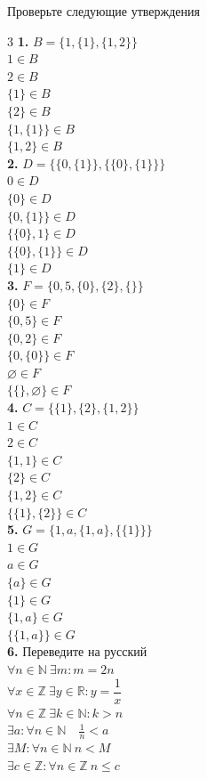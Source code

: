 \begin{exercise}
Проверьте следующие утверждения
\begin{multicols}{3}
\noindent \textbf{1.}
$B = \{1,\{1\},\{1,2\}\}$\\
$1 \in B$\\
$2 \in B$\\
$\{1\} \in B$\\
$\{2\} \in B$\\
$\{1,\{1\}\} \in B$\\
$\{1,2\} \in B$
\bigskip\\
\noindent \textbf{2.}
$D = \{\{0,\{1\}\},\{\{0\},\{1\}\}\}$\\
$0 \in D$\\
$\{0\} \in D$\\
$\{0,\{1\}\} \in D$\\
$\{\{0\},1\} \in D$\\
$\{\{0\},\{1\}\} \in D$\\
$\{1\} \in D$
\columnbreak
\bigskip\\
\noindent \textbf{3.}
$F = \{0,5,\{0\},\{2\},\{\}\}$\\
$\{0\} \in F$\\
$\{0,5\} \in F$\\
$\{0,2\} \in F$\\
$\{0,\{0\}\} \in F$\\
$\varnothing \in F$\\
$\{\{\},\varnothing\} \in F$
\bigskip\\
\noindent \textbf{4.}
$C = \{\{1\},\{2\},\{1,2\}\}$\\
$1 \in C$\\
$2 \in C$\\
$\{1,1\} \in C$\\
$\{2\} \in C$\\
$\{1,2\} \in C$\\
$\{\{1\},\{2\}\} \in C$
\columnbreak
\bigskip\\
\noindent \textbf{5.}
$G = \{1, a, \{1,a\}, \{\{1\}\}\}$\\
$1 \in G$\\
$a \in G$\\
$\{a\} \in G$\\
$\{1\} \in G$\\
$\{1,a\} \in G$\\
$\{\{1,a\}\} \in G$
\bigskip\\
\noindent \textbf{6.}
Переведите на русский\\
$\forall n\in\mathbb{N}\ \exists m\colon m = 2n$\\
$\forall x\in\mathbb{Z}\ \exists y\in\mathbb{R}\colon y = \dfrac{1}{x}$\\
$\forall n\in\mathbb{Z}\ \exists k\in\mathbb{N}\colon k>n$\\
$\exists a\colon\forall n\in\mathbb{N}\quad \frac{1}{n}<a$\\
$\exists M\colon\forall n\in\mathbb{N}\ n<M$\\
$\exists c\in\mathbb{Z}\colon\forall n\in\mathbb{Z}\ n\le c$
\end{multicols}
\end{exercise}
